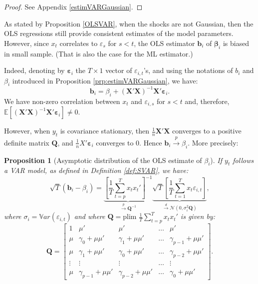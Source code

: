 \documentclass[
]{book}
\newtheorem{proposition}{Proposition}[chapter]
\theoremstyle{definition}
\theoremstyle{definition}
\theoremstyle{definition}
\theoremstyle{definition}
\theoremstyle{remark}
\begin{document}
\begin{proof}
See Appendix \ref{estimVARGaussian}.
\end{proof}

As stated by Proposition \ref{OLSVAR}, when the shocks are not Gaussian, then the OLS regressions still provide consistent estimates of the model parameters. However, since \(x_t\) correlates to \(\varepsilon_s\) for \(s<t\), the OLS estimator \(\mathbf{b}_i\) of \(\boldsymbol\beta_i\) is biased in small sample. (That is also the case for the ML estimator.)

Indeed, denoting by \(\boldsymbol\varepsilon_i\) the \(T \times 1\) vector of \(\varepsilon_{i,t}\)'s, and using the notations of \(b_i\) and \(\beta_i\) introduced in Proposition \ref{prp:estimVARGaussian}, we have:
\begin{equation}
\mathbf{b}_i = \beta_i + (\mathbf{X}'\mathbf{X})^{-1}\mathbf{X}'\boldsymbol\varepsilon_i.\label{eq:olsar1}
\end{equation}
We have non-zero correlation between \(x_t\) and \(\varepsilon_{i,s}\) for \(s<t\) and, therefore, \(\mathbb{E}[(\mathbf{X}'\mathbf{X})^{-1}\mathbf{X}'\boldsymbol\varepsilon_i] \ne 0\).

However, when \(y_t\) is covariance stationary, then \(\frac{1}{n}\mathbf{X}'\mathbf{X}\) converges to a positive definite matrix \(\mathbf{Q}\), and \(\frac{1}{n}X'\boldsymbol\varepsilon_i\) converges to 0. Hence \(\mathbf{b}_i \overset{p}{\rightarrow} \beta_i\). More precisely:

\begin{proposition}[Asymptotic distribution of the OLS estimate of $\beta_i$]
\protect\hypertarget{prp:OLSVAR}{}\label{prp:OLSVAR}If \(y_t\) follows a VAR model, as defined in Definition \ref{def:SVAR}, we have:
\[
\sqrt{T}(\mathbf{b}_i-\beta_i) =  \underbrace{\left[\frac{1}{T}\sum_{t=p}^T x_t x_t' \right]^{-1}}_{\overset{p}{\rightarrow} \mathbf{Q}^{-1}}
\underbrace{\sqrt{T} \left[\frac{1}{T}\sum_{t=1}^T x_t\varepsilon_{i,t} \right]}_{\overset{d}{\rightarrow} \mathcal{N}(0,\sigma_i^2\mathbf{Q})},
\]
where \(\sigma_i = \mathbb{V}ar(\varepsilon_{i,t})\) and where \(\mathbf{Q} = \mbox{plim }\frac{1}{T}\sum_{t=p}^T x_t x_t'\) is given by:
\begin{equation}
\mathbf{Q} = \left[
\begin{array}{ccccc}
1 & \mu' &\mu' & \dots & \mu' \\
\mu & \gamma_0 + \mu\mu' & \gamma_1 + \mu\mu' & \dots & \gamma_{p-1} + \mu\mu'\\
\mu & \gamma_1 + \mu\mu' & \gamma_0 + \mu\mu' & \dots & \gamma_{p-2} + \mu\mu'\\
\vdots &\vdots &\vdots &\dots &\vdots \\
\mu & \gamma_{p-1} + \mu\mu' & \gamma_{p-2} + \mu\mu' & \dots & \gamma_{0} + \mu\mu'
\end{array}
\right].\label{eq:Qols}
\end{equation}
\end{proposition}
\end{document}
